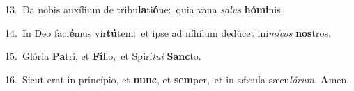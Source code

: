 {\numbfont\textcolor{\numbcolor}{13.}}~Da nobis auxílium de tribu\-\textbf{la}\-ti\-\textbf{ó}\-ne:~\star quia vana \textit{sa}\-\textit{lus} \textbf{hó}\-\textbf{mi}nis.\par
{\numbfont\textcolor{\numbcolor}{14.}}~In Deo faci\-\textbf{é}\-mus vir\-\textbf{tú}\-tem:~\star et ipse ad níhilum dedúcet ini\-\textit{mí}\-\textit{cos} \textbf{nos}\-tros.\par
{\numbfont\textcolor{\numbcolor}{15.}}~Glória \textbf{Pa}\-tri, et \textbf{Fí}\-lio,~\star et Spirí\-\textit{tu}\-\textit{i} \textbf{Sanc}\-to.\par
{\numbfont\textcolor{\numbcolor}{16.}}~Sicut erat in princípio, et \textbf{nunc}\-, et \textbf{sem}\-per,~\star et in sǽcula sæcu\-\textit{ló}\-\textit{rum}. \textbf{A}\-men.\par
